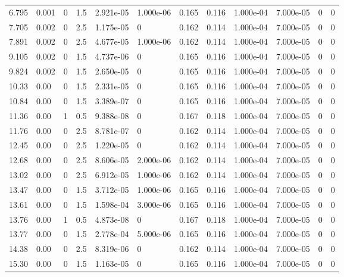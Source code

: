 \documentclass[preview]{standalone}
\begin{document}
{{\begin{tabular}{L{1.2cm}C{1.2cm} C{0.3cm}C{0.5cm} C{1.4cm}C{1.4cm} C{1.4cm}C{1.4cm} C{1.6cm}C{1.6cm} C{1.6cm}C{1.6cm}}
  6.795  &  0.001  & 0     & 1.5 &  2.921e-05  & 1.000e-06  &  0.165&   0.116& 1.000e-04 & 7.000e-05   &  0 & 0  \\ 
  7.705  &  0.002  & 0     & 2.5 &  1.175e-05  & 0  &  0.162&   0.114& 1.000e-04 & 7.000e-05   &  0 & 0  \\ 
  7.891  &  0.002  & 0     & 2.5 &  4.677e-05  & 1.000e-06  &  0.162&   0.114& 1.000e-04 & 7.000e-05   &  0 & 0  \\ 
  9.105  &  0.002  & 0     & 1.5 &  4.737e-06  & 0  &  0.165&   0.116& 1.000e-04 & 7.000e-05   &  0 & 0  \\ 
  9.824  &  0.002  & 0     & 1.5 &  2.650e-05  & 0  &  0.165&   0.116& 1.000e-04 & 7.000e-05   &  0 & 0  \\ 
  10.33  &  0.00  & 0     & 1.5 &  2.331e-05  & 0  &  0.165&   0.116& 1.000e-04 & 7.000e-05   &  0 & 0  \\ 
  10.84  &  0.00  & 0     & 1.5 &  3.389e-07  & 0  &  0.165&   0.116& 1.000e-04 & 7.000e-05   &  0 & 0  \\ 
  11.36  &  0.00  & 1     & 0.5 &  9.388e-08  & 0  &  0.167&   0.118& 1.000e-04 & 7.000e-05   &  0 & 0  \\ 
  11.76  &  0.00  & 0     & 2.5 &  8.781e-07  & 0  &  0.162&   0.114& 1.000e-04 & 7.000e-05   &  0 & 0  \\ 
  12.45  &  0.00  & 0     & 2.5 &  1.220e-05  & 0  &  0.162&   0.114& 1.000e-04 & 7.000e-05   &  0 & 0  \\ 
  12.68  &  0.00  & 0     & 2.5 &  8.606e-05  & 2.000e-06  &  0.162&   0.114& 1.000e-04 & 7.000e-05   &  0 & 0  \\ 
  13.02  &  0.00  & 0     & 2.5 &  6.912e-05  & 1.000e-06  &  0.162&   0.114& 1.000e-04 & 7.000e-05   &  0 & 0  \\ 
  13.47  &  0.00  & 0     & 1.5 &  3.712e-05  & 1.000e-06  &  0.165&   0.116& 1.000e-04 & 7.000e-05   &  0 & 0  \\ 
  13.61  &  0.00  & 0     & 1.5 &  1.598e-04  & 3.000e-06  &  0.165&   0.116& 1.000e-04 & 7.000e-05   &  0 & 0  \\ 
  13.76  &  0.00  & 1     & 0.5 &  4.873e-08  & 0  &  0.167&   0.118& 1.000e-04 & 7.000e-05   &  0 & 0  \\ 
  13.77  &  0.00  & 0     & 1.5 &  2.778e-04  & 5.000e-06  &  0.165&   0.116& 1.000e-04 & 7.000e-05   &  0 & 0  \\ 
  14.38  &  0.00  & 0     & 2.5 &  8.319e-06  & 0  &  0.162&   0.114& 1.000e-04 & 7.000e-05   &  0 & 0  \\ 
  15.30  &  0.00  & 0     & 1.5 &  1.163e-05  & 0  &  0.165&   0.116& 1.000e-04 & 7.000e-05   &  0 & 0  \\ 

\end{tabular}}}
\end{document}
